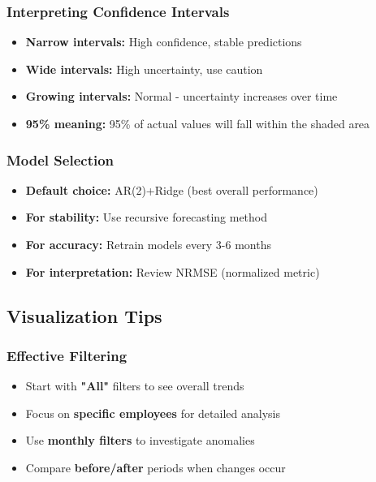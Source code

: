 \documentclass[11pt,a4paper]{article}
\begin{document}
\subsubsection{Interpreting Confidence Intervals}

\begin{itemize}[leftmargin=*]
    \item \textbf{Narrow intervals:} High confidence, stable predictions
    \item \textbf{Wide intervals:} High uncertainty, use caution
    \item \textbf{Growing intervals:} Normal - uncertainty increases over time
    \item \textbf{95\% meaning:} 95\% of actual values will fall within the shaded area
\end{itemize}

\subsubsection{Model Selection}

\begin{itemize}[leftmargin=*]
    \item \textbf{Default choice:} AR(2)+Ridge (best overall performance)
    \item \textbf{For stability:} Use recursive forecasting method
    \item \textbf{For accuracy:} Retrain models every 3-6 months
    \item \textbf{For interpretation:} Review NRMSE (normalized metric)
\end{itemize}

\subsection{Visualization Tips}

\subsubsection{Effective Filtering}

\begin{itemize}[leftmargin=*]
    \item Start with \textbf{"All"} filters to see overall trends
    \item Focus on \textbf{specific employees} for detailed analysis
    \item Use \textbf{monthly filters} to investigate anomalies
    \item Compare \textbf{before/after} periods when changes occur
\end{itemize}
\end{document}
